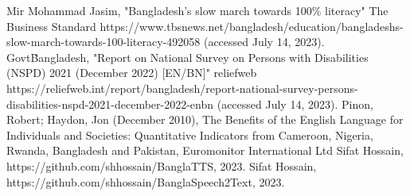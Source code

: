 \begin{thebibliography}{00}
     Mir Mohammad Jasim, "Bangladesh’s slow march towards 100\% literacy" The Business Standard https://www.tbsnews.net/bangladesh/education/bangladeshs-slow-march-towards-100-literacy-492058 (accessed July 14, 2023).
     Govt\. Bangladesh, "Report on National Survey on Persons with Disabilities (NSPD) 2021 (December 2022) [EN/BN]" reliefweb https://reliefweb.int/report/bangladesh/report-national-survey-persons-disabilities-nspd-2021-december-2022-enbn (accessed July 14, 2023).
     Pinon, Robert; Haydon, Jon (December 2010), The Benefits of the English Language for Individuals and Societies: Quantitative Indicators from Cameroon, Nigeria, Rwanda, Bangladesh and Pakistan, Euromonitor International Ltd
     Sifat Hossain, https://github.com/shhossain/BanglaTTS, 2023.
     Sifat Hossain, https://github.com/shhossain/BanglaSpeech2Text, 2023.
\end{thebibliography}
